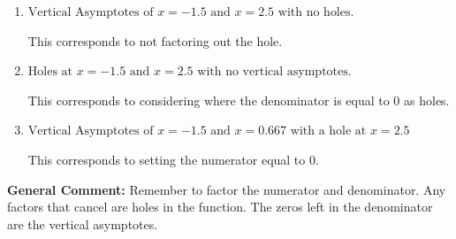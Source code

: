 \documentclass{extbook}[14pt]
\begin{document}
\begin{enumerate}
{\begin{enumerate}[label=\Alph*.]
This corresponds to mixing vertical and horizontal asymptotes.
\item \( \text{Vertical Asymptotes of } x = -1.5 \text{ and } x = 2.5 \text{ with no holes.} \)

This corresponds to not factoring out the hole.
\item \( \text{Holes at } x = -1.5 \text{ and } x = 2.5 \text{ with no vertical asymptotes.} \)

This corresponds to considering where the denominator is equal to 0 as holes.
\item \( \text{Vertical Asymptotes of } x = -1.5 \text{ and } x = 0.667 \text{ with a hole at } x = 2.5 \)

This corresponds to setting the numerator equal to 0.
\end{enumerate}

\textbf{General Comment:} Remember to factor the numerator and denominator. Any factors that cancel are holes in the function. The zeros left in the denominator are the vertical asymptotes.
}
\end{enumerate}
\end{document}
